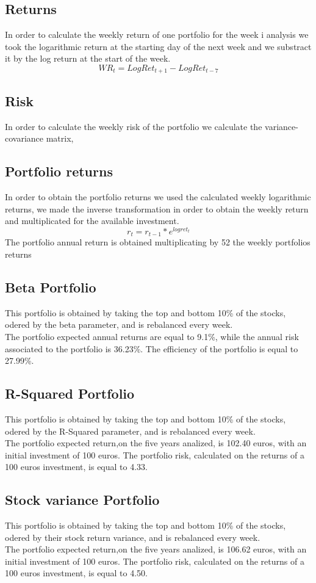 \documentclass[12pt, a4paper, twocolumn]{article} %
\begin{document}
	\subsection{Returns}
	In order to calculate the weekly return of one portfolio for the week i analysis we took the logarithmic return at the starting day of the next week and we substract it by the log return at the start of the week.
	\[
		WR_t = LogRet_{t+1} - LogRet_{t-7}
	\]
	\subsection{Risk}
	In order to calculate the weekly risk of the portfolio we calculate the variance-covariance matrix,
	\subsection{Portfolio returns}
	In order to obtain the portfolio returns we used the calculated weekly logarithmic returns, we made the inverse transformation in order to obtain the weekly return and multiplicated for the available investment.
	\[
	r_{t}	= r_{t-1}*e^{logret_{t}}
	\]
	The portfolio annual return is obtained multiplicating by 52 the weekly portfolios returns
	\subsection{Beta Portfolio}
	This portfolio is obtained by taking the top and bottom 10\% of the stocks, odered by the beta parameter, and is rebalanced every week.\\
	The portfolio expected annual returns are equal to 9.1\%, while the annual risk associated to the portfolio is 36.23\%. The efficiency of the portfolio is equal to 27.99\%.
	\subsection{R-Squared Portfolio}
	This portfolio is obtained by taking the top and bottom 10\% of the stocks, odered by the R-Squared parameter, and is rebalanced every week.\\
	The portfolio expected return,on the five years analized, is 102.40 euros, with an initial investment of 100 euros. The portfolio risk, calculated on the returns of a 100 euros investment, is equal to 4.33.
	\subsection{Stock variance Portfolio}
	This portfolio is obtained by taking the top and bottom 10\% of the stocks, odered by their stock return variance, and is rebalanced every week.\\
	The portfolio expected return,on the five years analized, is 106.62 euros, with an initial investment of 100 euros. The portfolio risk, calculated on the returns of a 100 euros investment, is equal to 4.50.
\end{document}
